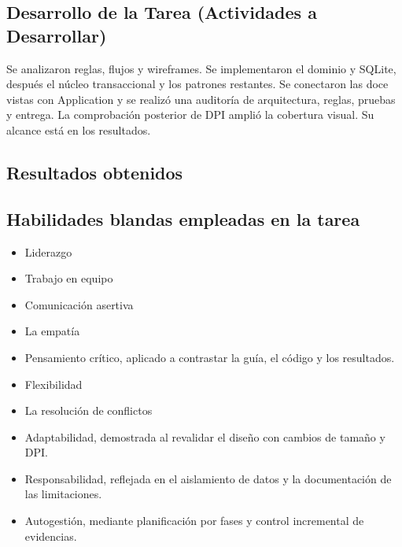 \documentclass{article}
\begin{document}
\subsection{Desarrollo de la Tarea (Actividades a Desarrollar)}
Se analizaron reglas, flujos y wireframes. Se implementaron el dominio y SQLite, después el núcleo transaccional y los patrones restantes. Se conectaron las doce vistas con Application y se realizó una auditoría de arquitectura, reglas, pruebas y entrega. La comprobación posterior de DPI amplió la cobertura visual. Su alcance está en los resultados.

\clearpage
\begingroup\small\setlength{\parskip}{0pt}\tableofcontents\endgroup
\clearpage
\subsection{Resultados obtenidos}











\clearpage\subsection{Habilidades blandas empleadas en la tarea}
\begin{itemize}
\item[$\square$] Liderazgo
\item[$\square$] Trabajo en equipo
\item[$\square$] Comunicación asertiva
\item[$\square$] La empatía
\item[$\checkmark$] Pensamiento crítico, aplicado a contrastar la guía, el código y los resultados.
\item[$\square$] Flexibilidad
\item[$\square$] La resolución de conflictos
\item[$\checkmark$] Adaptabilidad, demostrada al revalidar el diseño con cambios de tamaño y DPI.
\item[$\checkmark$] Responsabilidad, reflejada en el aislamiento de datos y la documentación de las limitaciones.
\item[$\checkmark$] Autogestión, mediante planificación por fases y control incremental de evidencias.
\end{itemize}
\end{document}
